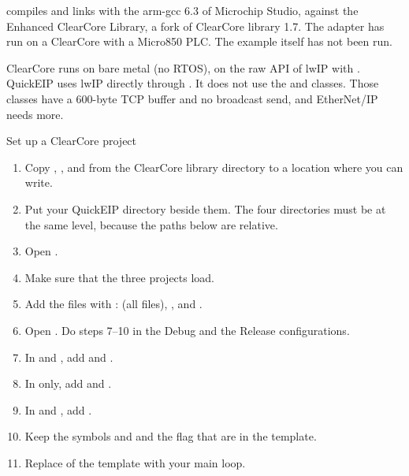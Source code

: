  compiles and links with the arm-gcc 6.3 of
Microchip Studio, against the Enhanced ClearCore Library, a fork of ClearCore
library 1.7. The adapter has run on a ClearCore with a Micro850 PLC. The
example itself has not been run.

ClearCore runs on bare metal (no RTOS), on the raw API of lwIP with
. QuickEIP uses lwIP directly through . It
does not use the  and  classes. Those
classes have a 600-byte TCP buffer and no broadcast send, and EtherNet/IP
needs more.

\begin{procedure}{Set up a ClearCore project}
\begin{enumerate}
  \item Copy , , and 
        from the ClearCore library directory to a location where you can
        write.
  \item Put your QuickEIP directory beside them. The four directories must be
        at the same level, because the paths below are relative.
  \item Open .
  \item Make sure that the three projects load.
  \item Add the files with :
         (all files), ,
        and .
  \item Open . Do steps 7--10 in the
        Debug and the Release configurations.
  \item In  and , add  and
        .
  \item In  only, add
         and
        .
  \item In  and , add .
  \item Keep the symbols  and  and the flag
         that are in the template.
  \item Replace  of the template with your main loop.
\end{enumerate}
\end{procedure}

